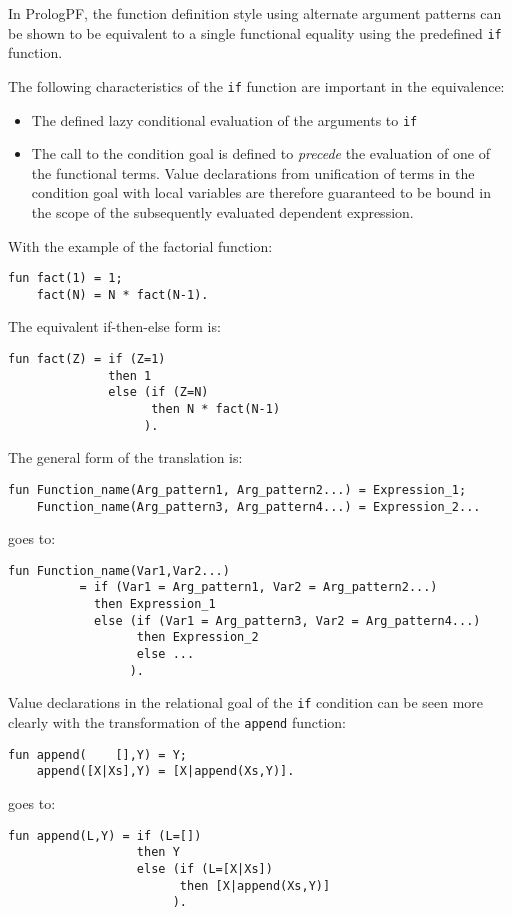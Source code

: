 In PrologPF, the function definition style using alternate argument patterns can
be shown to be equivalent to a single functional equality using the
predefined \texttt{if} function.

The following characteristics of the \texttt{if} function are
important in the equivalence:
\begin{itemize}
\item{The defined lazy conditional evaluation of the arguments to \texttt{if}}
\item{The call to the condition
  goal is defined to \textit{precede} the evaluation of one of the functional terms.
  Value declarations from unification of terms in the condition goal with local
  variables are therefore guaranteed to be bound in the scope of the subsequently
  evaluated dependent expression.}
\end{itemize}

With the example of the factorial function:
\begin{verbatim}
fun fact(1) = 1;
    fact(N) = N * fact(N-1).
\end{verbatim}
The equivalent if-then-else form is:
\begin{verbatim}
fun fact(Z) = if (Z=1)
              then 1
              else (if (Z=N)
                    then N * fact(N-1)
                   ).
\end{verbatim}
The general form of the translation is:
\begin{verbatim}
fun Function_name(Arg_pattern1, Arg_pattern2...) = Expression_1;
    Function_name(Arg_pattern3, Arg_pattern4...) = Expression_2...
\end{verbatim}
goes to:
\begin{verbatim}
fun Function_name(Var1,Var2...)
          = if (Var1 = Arg_pattern1, Var2 = Arg_pattern2...)
            then Expression_1
            else (if (Var1 = Arg_pattern3, Var2 = Arg_pattern4...)
                  then Expression_2
                  else ...
                 ).
\end{verbatim}
Value declarations in the relational goal of the \texttt{if} condition can be seen more
clearly with the transformation of the \texttt{append} function:
\begin{verbatim}
fun append(    [],Y) = Y;
    append([X|Xs],Y) = [X|append(Xs,Y)].
\end{verbatim}
goes to:
\begin{verbatim}
fun append(L,Y) = if (L=[])
                  then Y
                  else (if (L=[X|Xs])
                        then [X|append(Xs,Y)]
                       ).
\end{verbatim}


